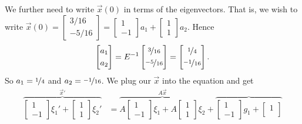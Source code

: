 \begin{exampleSol}
We further need to write $\vec{x}(0)$ in terms of the eigenvectors.
That is, we wish to write $\vec{x}(0) = 
\left[ \begin{smallmatrix}
3/16 \\
-5/16
\end{smallmatrix} \right] = 
\left[ \begin{smallmatrix}
1 \\
-1
\end{smallmatrix} \right] a_1 +
\left[ \begin{smallmatrix}
1 \\
1
\end{smallmatrix} \right] a_2$.  Hence
\begin{equation*}
\begin{bmatrix}
a_1 \\
\noalign{\smallskip}
a_2
\end{bmatrix} = 
E^{-1}
\begin{bmatrix}
\nicefrac{3}{16} \\
\noalign{\smallskip}
\nicefrac{-5}{16}
\end{bmatrix}
=
\begin{bmatrix}
\nicefrac{1}{4} \\
\noalign{\smallskip}
\nicefrac{-1}{16}
\end{bmatrix} .
\end{equation*}
So $a_1 = \nicefrac{1}{4}$ and $a_2 = \nicefrac{-1}{16}$.
We plug our $\vec{x}$ into the equation and get
\begin{equation*}
\begin{split}
\overbrace{
\begin{bmatrix}
1 \\
-1
\end{bmatrix} \xi_1' +
\begin{bmatrix}
1 \\
1
\end{bmatrix} \xi_2'
}^{\vec{x}'}
& =
\overbrace{
A
\begin{bmatrix}
1 \\
-1
\end{bmatrix} \xi_1 +
A
\begin{bmatrix}
1 \\
1
\end{bmatrix} \xi_2
}^{A\vec{x}}
+
\overbrace{
\begin{bmatrix}
1 \\
-1
\end{bmatrix} g_1 +
\begin{bmatrix}
1 \\

\end{bmatrix}}
\end{split}
\end{equation*}
\end{exampleSol}
